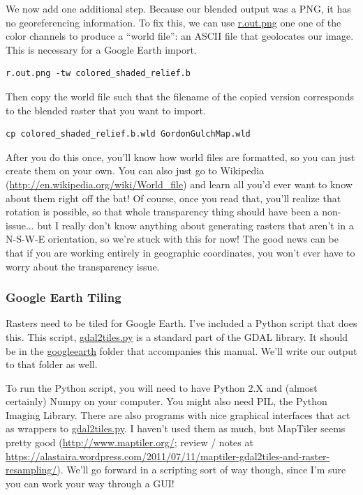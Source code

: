 \documentclass{book}
\begin{document}
We now add one additional step. Because our blended output was a PNG, it has no georeferencing information. To fix this, we can use \url{r.out.png} one one of the color channels to produce a ``world file'': an ASCII file that geolocates our image. This is necessary for a Google Earth import.
\begin{lstlisting}
r.out.png -tw colored_shaded_relief.b
\end{lstlisting}
Then copy the world file such that the filename of the copied version corresponds to the blended raster that you want to import.
\begin{lstlisting}
cp colored_shaded_relief.b.wld GordonGulchMap.wld
\end{lstlisting}
After you do this once, you'll know how world files are formatted, so you can just create them on your own. You can also just go to Wikipedia (\url{http://en.wikipedia.org/wiki/World_file}) and learn all you'd ever want to know about them right off the bat! Of course, once you read that, you'll realize that rotation is possible, so that whole transparency thing should have been a non-issue... but I really don't know anything about generating rasters that aren't in a N-S-W-E orientation, so we're stuck with this for now! The good news can be that if you are working entirely in geographic coordinates, you won't ever have to worry about the transparency issue.

\subsubsection{Google Earth Tiling}

Rasters need to be tiled for Google Earth. I've included a Python script that does this. This script, \url{gdal2tiles.py} is a standard part of the GDAL library. It should be in the \url{googleearth} folder that accompanies this manual. We'll write our output to that folder as well.

To run the Python script, you will need to have Python 2.X and (almost certainly) Numpy on your computer. You might also need PIL, the Python Imaging Library. There are also programs with nice graphical interfaces that act as wrappers to \url{gdal2tiles.py}. I haven't used them as much, but MapTiler seems pretty good (\url{http://www.maptiler.org/}; review / notes at \url{https://alastaira.wordpress.com/2011/07/11/maptiler-gdal2tiles-and-raster-resampling/}). We'll go forward in a scripting sort of way though, since I'm sure you can work your way through a GUI!
\end{document}
